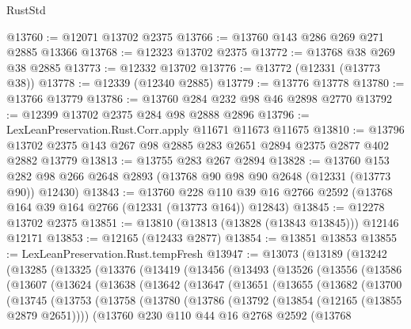 \begin{lexlean}{RustStd}
\begin{coremodule}
@13760 := @12071 @13702 @2375
@13766 := @13760 @143 @286 @269 @271 @2885 @13366
@13768 := @12323 @13702 @2375
@13772 := @13768 @38 @269 @38 @2885
@13773 := @12332 @13702
@13776 := @13772 (@12331 (@13773 @38))
@13778 := @12339 (@12340 @2885)
@13779 := @13776 @13778
@13780 := @13766 @13779
@13786 := @13760 @284 @232 @98 @46 @2898 @2770
@13792 := @12399 @13702 @2375 @284 @98 @2888 @2896
@13796 := LexLeanPreservation.Rust.Corr.apply @11671 @11673 @11675
@13810 := @13796 @13702 @2375 @143 @267 @98 @2885 @283 @2651 @2894 @2375 @2877 @402 @2882 @13779
@13813 := @13755 @283 @267 @2894
@13828 := @13760
    @153
    @282
    @98
    @266
    @2648
    @2893
    (@13768 @90 @98 @90 @2648 (@12331 (@13773 @90)) @12430)
@13843 := @13760
    @228
    @110
    @39
    @16
    @2766
    @2592
    (@13768 @164 @39 @164 @2766 (@12331 (@13773 @164)) @12843)
@13845 := @12278 @13702 @2375
@13851 := @13810 (@13813 (@13828 (@13843 @13845))) @12146 @12171
@13853 := @12165 (@12433 @2877)
@13854 := @13851 @13853
@13855 := LexLeanPreservation.Rust.tempFresh
@13947 := @13073
    (@13189
      (@13242
        (@13285
          (@13325
            (@13376
              (@13419
                (@13456
                  (@13493
                    (@13526
                      (@13556
                        (@13586
                          (@13607
                            (@13624
                              (@13638
                                (@13642
                                  (@13647
                                    (@13651
                                      (@13655
                                        (@13682
                                          (@13700
                                            (@13745
                                              (@13753
                                                (@13758
                                                  (@13780
                                                    (@13786
                                                      (@13792
                                                        (@13854 (@12165 (@13855 @2879 @2651))))
                                                      (@13760
                                                        @230
                                                        @110
                                                        @44
                                                        @16
                                                        @2768
                                                        @2592
                                                        (@13768

\end{coremodule}
\end{lexlean}

